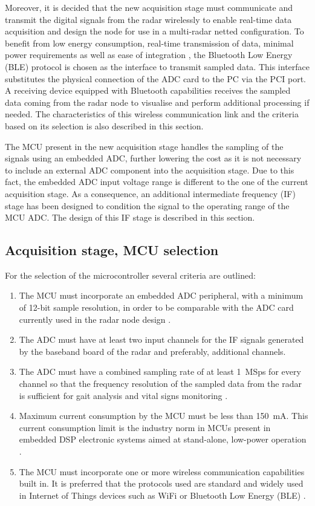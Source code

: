 Moreover, it is decided that the new acquisition stage must communicate and transmit the digital signals from the radar wirelessly to enable real-time data acquisition and design the node for use in a multi-radar netted configuration. To benefit from low energy consumption, real-time transmission of data, minimal power requirements as well as ease of integration \cite{Gomez2012}, the Bluetooth Low Energy (BLE) protocol is chosen as the interface to transmit sampled data. This interface substitutes the physical connection of the ADC card to the PC via the PCI port. A receiving device equipped with Bluetooth capabilities receives the sampled data coming from the radar node to visualise and perform additional processing if needed. The characteristics of this wireless communication link and the criteria based on its selection is also described in this section.

The MCU present in the new acquisition stage handles the sampling of the signals using an embedded ADC, further lowering the cost as it is not necessary to include an external ADC component into the acquisition stage. Due to this fact, the embedded ADC input voltage range is different to the one of the current acquisition stage. As a consequence, an additional intermediate frequency (IF) stage has been designed to condition the signal to the operating range of the MCU ADC. The design of this IF stage is described in this section.

\subsection{Acquisition stage, MCU selection}

For the selection of the microcontroller several criteria are outlined:
\begin{enumerate}
	\item The MCU must incorporate an embedded ADC peripheral, with a minimum of 12-bit sample resolution, in order to be comparable with the ADC card currently used in the radar node design \cite{Sardinero2022, ADLINKTechnologies2010}.
	\item The ADC must have at least two input channels for the IF signals generated by the baseband board of the radar and preferably, additional channels.
	\item The ADC must have a combined sampling rate of at least \SI{1}{MSps} for every channel so that the frequency resolution of the sampled data from the radar is sufficient for gait analysis and vital signs monitoring \cite{Antolinos2020, Sardinero2022}.
	\item Maximum current consumption by the MCU must be less than \SI{150}{\milli\ampere}. This current consumption limit is the industry norm in MCUs present in embedded DSP electronic systems aimed at stand-alone, low-power operation \cite{Benini2001}.
	\item The MCU must incorporate one or more wireless communication capabilities built in. It is preferred that the protocols used are standard and widely used in Internet of Things devices such as WiFi or Bluetooth Low Energy (BLE) \cite{AlSarawi2017}.
\end{enumerate}

